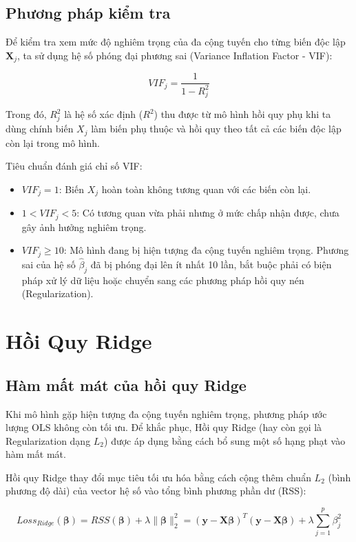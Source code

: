 \subsection{Phương pháp kiểm tra}

Để kiểm tra xem mức độ nghiêm trọng của đa cộng tuyến cho từng biến độc lập $\mathbf{X}_j$, ta sử dụng hệ số phóng đại phương sai (Variance Inflation Factor - VIF):

$$VIF_j = \frac{1}{1 - R_j^2}$$

Trong đó, $R_j^2$ là hệ số xác định ($R^2$) thu được từ mô hình hồi quy phụ khi ta dùng chính biến $X_j$ làm biến phụ thuộc và hồi quy theo tất cả các biến độc lập còn lại trong mô hình.

Tiêu chuẩn đánh giá chỉ số VIF:

\begin{itemize}[topsep=0pt, itemsep=2.5pt, leftmargin=1.5cm]
    \item $VIF_j = 1$: Biến $X_j$ hoàn toàn không tương quan với các biến còn lại.
    \item $1 < VIF_j < 5$: Có tương quan vừa phải nhưng ở mức chấp nhận được, chưa gây ảnh hưởng nghiêm trọng.
    \item $VIF_j \ge 10$: Mô hình đang bị hiện tượng đa cộng tuyến nghiêm trọng. Phương sai của hệ số $\hat{\beta}_j$ đã bị phóng đại lên ít nhất 10 lần, bắt buộc phải có biện pháp xử lý dữ liệu hoặc chuyển sang các phương pháp hồi quy nén (Regularization).
\end{itemize}

\section{Hồi Quy Ridge}

\subsection{Hàm mất mát của hồi quy Ridge}

Khi mô hình gặp hiện tượng đa cộng tuyến nghiêm trọng, phương pháp ước lượng OLS không còn tối ưu. Để khắc phục, Hồi quy Ridge (hay còn gọi là Regularization dạng $L_2$) được áp dụng bằng cách bổ sung một số hạng phạt vào hàm mất mát.

Hồi quy Ridge thay đổi mục tiêu tối ưu hóa bằng cách cộng thêm chuẩn $L_2$ (bình phương độ dài) của vector hệ số vào tổng bình phương phần dư (RSS):

$$Loss_{Ridge}(\boldsymbol{\beta}) = RSS(\boldsymbol{\beta}) + \lambda \|\boldsymbol{\beta}\|_2^2 = (\mathbf{y} - \mathbf{X}\boldsymbol{\beta})^T(\mathbf{y} - \mathbf{X}\boldsymbol{\beta}) + \lambda \sum_{j=1}^p \beta_j^2$$

